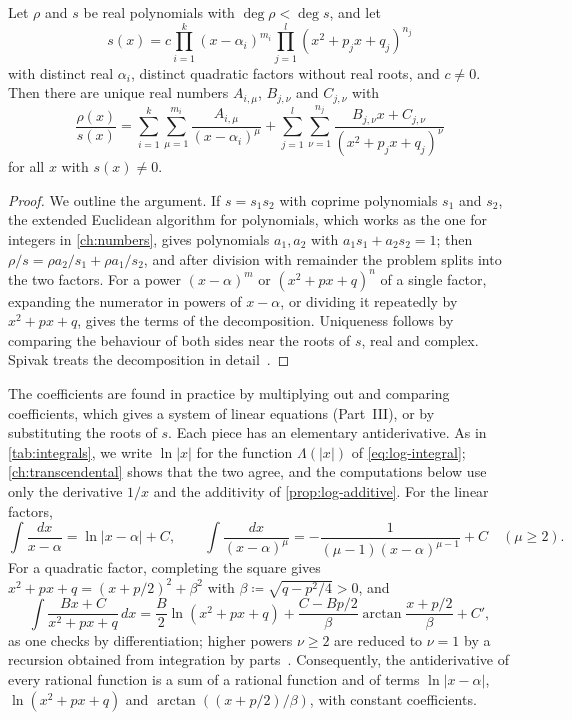 \begin{theorem}
\label{thm:partial-fractions}
Let $\rho$ and $s$ be real polynomials with $\deg\rho<\deg s$, and let
\[
s(x)=c\prod_{i=1}^k(x-\alpha_i)^{m_i}\prod_{j=1}^l(x^2+p_jx+q_j)^{n_j}
\]
with distinct real $\alpha_i$, distinct quadratic factors without real roots, and $c\ne0$. Then there are unique real numbers $A_{i,\mu}$, $B_{j,\nu}$ and $C_{j,\nu}$ with
\[
\frac{\rho(x)}{s(x)}=\sum_{i=1}^k\sum_{\mu=1}^{m_i}\frac{A_{i,\mu}}{(x-\alpha_i)^\mu}+\sum_{j=1}^l\sum_{\nu=1}^{n_j}\frac{B_{j,\nu}x+C_{j,\nu}}{(x^2+p_jx+q_j)^\nu}
\]
for all $x$ with $s(x)\ne0$.
\end{theorem}

\begin{proof}
We outline the argument. If $s=s_1s_2$ with coprime polynomials $s_1$ and $s_2$, the extended Euclidean algorithm for polynomials, which works as the one for integers in \cref{ch:numbers}, gives polynomials $a_1,a_2$ with $a_1s_1+a_2s_2=1$; then $\rho/s=\rho a_2/s_1+\rho a_1/s_2$, and after division with remainder the problem splits into the two factors. For a power $(x-\alpha)^m$ or $(x^2+px+q)^n$ of a single factor, expanding the numerator in powers of $x-\alpha$, or dividing it repeatedly by $x^2+px+q$, gives the terms of the decomposition. Uniqueness follows by comparing the behaviour of both sides near the roots of $s$, real and complex. Spivak treats the decomposition in detail~\cite{spivak2008calculus}.
\end{proof}

The coefficients are found in practice by multiplying out and comparing coefficients, which gives a system of linear equations (Part~III), or by substituting the roots of $s$. Each piece has an elementary antiderivative. As in \cref{tab:integrals}, we write $\ln|x|$ for the function $\Lambda(|x|)$ of \eqref{eq:log-integral}; \cref{ch:transcendental} shows that the two agree, and the computations below use only the derivative $1/x$ and the additivity of \cref{prop:log-additive}. For the linear factors,
\[
\int\frac{dx}{x-\alpha}=\ln|x-\alpha|+C,\qquad\int\frac{dx}{(x-\alpha)^\mu}=-\frac1{(\mu-1)(x-\alpha)^{\mu-1}}+C\quad(\mu\ge2).
\]
For a quadratic factor, completing the square gives $x^2+px+q=(x+p/2)^2+\beta^2$ with $\beta\coloneqq\sqrt{q-p^2/4}>0$, and
\[
\int\frac{Bx+C}{x^2+px+q}\,dx=\frac B2\ln(x^2+px+q)+\frac{C-Bp/2}\beta\arctan\frac{x+p/2}\beta+C' ,
\]
as one checks by differentiation; higher powers $\nu\ge2$ are reduced to $\nu=1$ by a recursion obtained from integration by parts~\cite{spivak2008calculus}. Consequently, the antiderivative of every rational function is a sum of a rational function and of terms $\ln|x-\alpha|$, $\ln(x^2+px+q)$ and $\arctan((x+p/2)/\beta)$, with constant coefficients.

